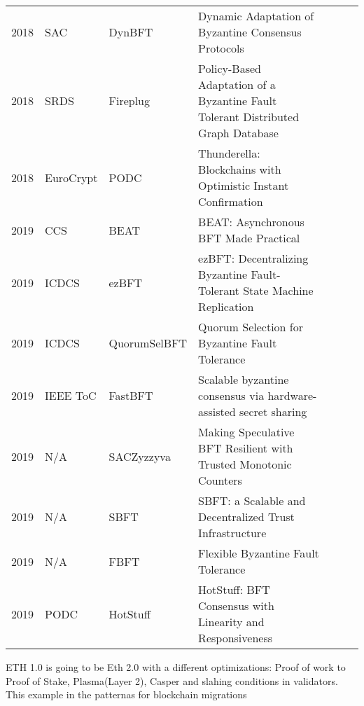 \documentclass{article}
\begin{document}
\begin{landscape}
\begin{longtable}[c]{llll|l|l|l|}
2018 & SAC               & DynBFT                  & Dynamic Adaptation of Byzantine Consensus Protocols                                       &            &          &              \\ \cline{5-7} 
2018 & SRDS              & Fireplug                & Policy-Based Adaptation of a Byzantine Fault Tolerant Distributed Graph Database          &            &          &              \\ \cline{5-7} 
2018 & EuroCrypt         & PODC                    & Thunderella: Blockchains with Optimistic Instant Confirmation                             &            &          &              \\ \cline{5-7} 
2019 & CCS               & BEAT                    & BEAT: Asynchronous BFT Made Practical                                                     &            &          &              \\ \cline{5-7} 
2019 & ICDCS             & ezBFT                   & ezBFT: Decentralizing Byzantine Fault-Tolerant State Machine Replication                  &            &          &              \\ \cline{5-7} 
2019 & ICDCS             & QuorumSelBFT            & Quorum Selection for Byzantine Fault Tolerance                                            &            &          &              \\ \cline{5-7} 
2019 & IEEE ToC          & FastBFT                 & Scalable byzantine consensus via hardware-assisted secret sharing                         &            &          &              \\ \cline{5-7} 
2019 & N/A               & SACZyzzyva              & Making Speculative BFT Resilient with Trusted Monotonic Counters                          &            &          &              \\ \cline{5-7} 
2019 & N/A               & SBFT                    & SBFT: a Scalable and Decentralized Trust Infrastructure                                   &            &          &              \\ \cline{5-7} 
2019 & N/A               & FBFT                    & Flexible Byzantine Fault Tolerance                                                        &            &          &              \\ \cline{5-7} 
2019 & PODC              & HotStuff                & HotStuff: BFT Consensus with Linearity and Responsiveness                                 &            &          &              \\ \hline
\end{longtable}
\end{landscape}
ETH 1.0\cite{wood2014ethereum} is going to be Eth 2.0\cite{caspereth2} with a different optimizations: Proof of work to Proof of Stake, Plasma(Layer 2), Casper and slahing conditions in validators.
This example in the patternas for blockchain migrations \cite{DBLP:journals/corr/abs-1906-00239} 
\end{document}
